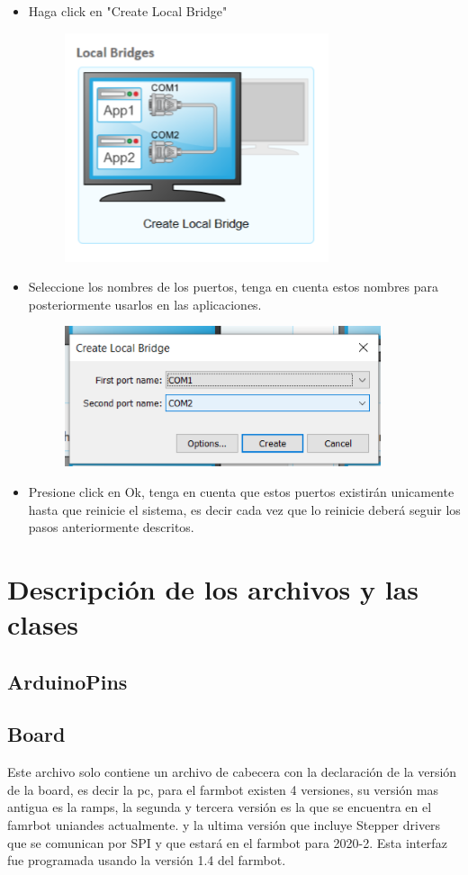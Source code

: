 \documentclass[letterpaper,12pt]{article}
\begin{document}
\begin{itemize}
	
	\item Haga click en "Create Local Bridge"
	\begin{figure}[H]
		\centering
		\includegraphics[width=0.5\linewidth]{images/virtual2}
		\label{fig:virtual2}
	\end{figure}
	\item Seleccione los nombres de los puertos, tenga en cuenta estos nombres para posteriormente usarlos en las aplicaciones.
	\begin{figure}[H]
		\centering
		\includegraphics[width=0.5\linewidth]{images/virtual3}
		\caption{}
		\label{fig:virtual3}
	\end{figure}
	\item Presione click en Ok, tenga en cuenta que estos puertos existirán unicamente hasta que reinicie el sistema, es decir cada vez que lo reinicie deberá seguir los pasos anteriormente descritos.
\end{itemize}

	\section{Descripción de los archivos y las clases}
	
	\subsection{ArduinoPins}
	\label{sub_ArduinoPins}

	\subsection{Board}
	Este archivo solo contiene un archivo de cabecera con la declaración de la versión de la board, es decir la pc, para el farmbot existen 4 versiones, su versión mas antigua es la ramps, la segunda y tercera versión es la que se encuentra en el famrbot uniandes actualmente. y la ultima versión que incluye Stepper drivers que se comunican por SPI y que estará en el farmbot para 2020-2. Esta interfaz fue programada usando la versión 1.4 del farmbot.
\end{document}
